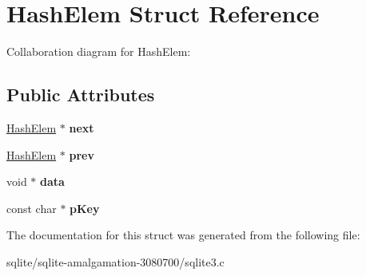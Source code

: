 \hypertarget{struct_hash_elem}{\section{Hash\+Elem Struct Reference}
\label{struct_hash_elem}
}


Collaboration diagram for Hash\+Elem\+:
\subsection*{Public Attributes}
\begin{DoxyCompactItemize}
\item 
\hypertarget{struct_hash_elem_a2d28fad45ff21ffb8a02a7133df860fd}{\hyperlink{struct_hash_elem}{Hash\+Elem} $\ast$ {\bfseries next}}\label{struct_hash_elem_a2d28fad45ff21ffb8a02a7133df860fd}

\item 
\hypertarget{struct_hash_elem_ae4d011c0dc807a3c100ccdb927dd0ba9}{\hyperlink{struct_hash_elem}{Hash\+Elem} $\ast$ {\bfseries prev}}\label{struct_hash_elem_ae4d011c0dc807a3c100ccdb927dd0ba9}

\item 
\hypertarget{struct_hash_elem_ac7e80f63ba2f82457ff68aa0cd360365}{void $\ast$ {\bfseries data}}\label{struct_hash_elem_ac7e80f63ba2f82457ff68aa0cd360365}

\item 
\hypertarget{struct_hash_elem_a9c33a7c8ac467a5547a123338daf61f4}{const char $\ast$ {\bfseries p\+Key}}\label{struct_hash_elem_a9c33a7c8ac467a5547a123338daf61f4}

\end{DoxyCompactItemize}


The documentation for this struct was generated from the following file\+:\begin{DoxyCompactItemize}
\item 
sqlite/sqlite-\/amalgamation-\/3080700/sqlite3.\+c\end{DoxyCompactItemize}
